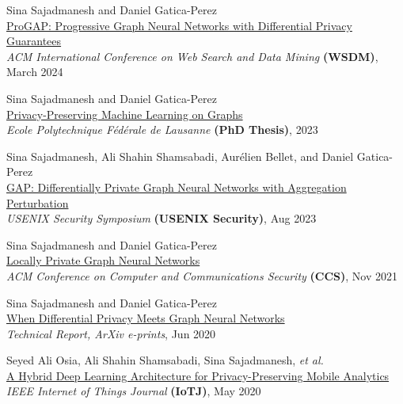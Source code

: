 \documentclass[11pt]{article}
\begin{document}
\begin{outerlist}

	\item {Sina Sajadmanesh} and Daniel Gatica-Perez\\
	\href{https://arxiv.org/abs/2304.08928}{{ProGAP: Progressive Graph Neural Networks with Differential Privacy Guarantees}}\\
	\textit{ACM International Conference on Web Search and Data Mining
  } \textbf{(WSDM)}, March 2024

  \item {Sina Sajadmanesh} and Daniel Gatica-Perez\\
	\href{https://arxiv.org/abs/2304.08928}{{Privacy-Preserving Machine Learning on Graphs}}\\
	\textit{Ecole Polytechnique Fédérale de Lausanne} \textbf{(PhD Thesis)}, 2023

	\item {Sina Sajadmanesh}, Ali Shahin Shamsabadi, Aurélien Bellet, and Daniel Gatica-Perez\\
	\href{https://arxiv.org/abs/2203.00949}{{GAP: Differentially Private Graph Neural Networks with Aggregation Perturbation}}\\
	\textit{USENIX Security Symposium }\textbf{(USENIX Security)}, Aug 2023

	\item {Sina Sajadmanesh} and Daniel Gatica-Perez\\
	\href{https://arxiv.org/abs/2006.05535}{{Locally Private Graph Neural Networks}}\\
	\textit{ACM Conference on Computer and Communications Security }\textbf{(CCS)}, Nov 2021

  \item {Sina Sajadmanesh} and Daniel Gatica-Perez\\
	\href{https://arxiv.org/abs/2006.05535v3}{{When Differential Privacy Meets Graph Neural Networks}}\\
	\textit{Technical Report, ArXiv e-prints}, Jun 2020

	\item Seyed Ali Osia, Ali Shahin Shamsabadi, {Sina Sajadmanesh}, \textit{et al.}\\
	\href{https://arxiv.org/abs/1703.02952}{{A Hybrid Deep Learning Architecture for Privacy-Preserving Mobile Analytics}}\\
	\textit{IEEE Internet of Things Journal} \textbf{(IoTJ)}, May 2020


\end{outerlist}
\end{document}
